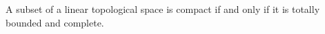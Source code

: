 A subset of a linear topological space is compact if and only if it is totally bounded and complete.
